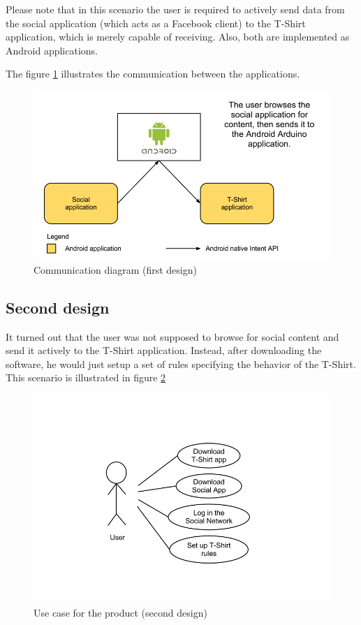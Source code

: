 Please note that in this scenario the user is required to actively send data from
the social application (which acts as a Facebook client) to the T-Shirt application,
which is merely capable of receiving. Also, both are implemented as Android applications.


The figure \ref{fig:design-resp} illustrates the communication between the applications.

\begin{figure}[h!]
	\centering \includegraphics[scale=0.35]{img/design-resp.png}
	\caption{Communication diagram (first design)}
	\label{fig:design-resp}
\end{figure}


\subsection{Second design}
It turned out that the user was not supposed to browse for social content and send it actively
to the T-Shirt application. Instead, after downloading the software, he would just setup a set of rules
specifying the behavior of the T-Shirt. This scenario is illustrated in figure \ref{fig:design-usecase2}

\begin{figure}[h!]
	\centering \includegraphics[scale=0.35]{img/design-usecase2}
	\caption{Use case for the product (second design)}
	\label{fig:design-usecase2}
\end{figure}

